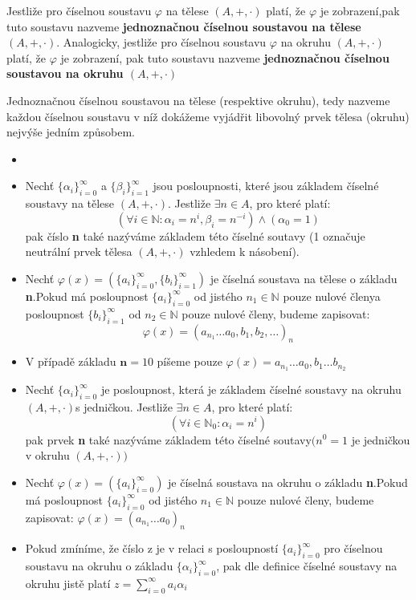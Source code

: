 \documentclass[czech,bachelor,dept470,male]{diploma}
\newcommand{\poslbeta}{\{\beta_i\}_{i=1}^{\infty}}
\newcommand{\poslalpha}{\{\alpha_i\}_{i=0}^{\infty}}
\newcommand{\posla}{\{a_i\}_{i=0}^{\infty}}
\newcommand{\poslb}{\{b_i\}_{i=1}^{\infty}}
\begin{document}
\begin{definition}
	Jestliže pro číselnou soustavu $\varphi$ na tělese $(A,+,\cdot)$ platí, že $\varphi$ je zobrazení,\newline pak tuto soustavu nazveme \textbf{jednoznačnou číselnou soustavou na tělese $(A,+,\cdot)$}. Analogicky, jestliže pro číselnou soustavu $\varphi$ na okruhu $(A,+,\cdot)$ platí, že $\varphi$ je zobrazení, pak tuto soustavu nazveme \textbf{jednoznačnou číselnou soustavou na okruhu $(A,+,\cdot)$}
\end{definition}
Jednoznačnou číselnou soustavou na tělese (respektive okruhu), tedy nazveme každou číselnou soustavu v níž dokážeme vyjádřit libovolný prvek tělesa (okruhu) nejvýše jedním způsobem.
\begin{agreement}\label{u1}
	\begin{itemize}
		\item[]
		\item Nechť $\poslalpha$ a $\poslbeta$ jsou posloupnosti, které jsou základem číselné soustavy na tělese $(A,+,\cdot)$. Jestliže $\exists n \in A$, pro které platí:
		      $$ (\forall i \in \mathbb{N} : \alpha_i = n^i,\beta_i = n^{-i}) \land (\alpha_{0} = 1)$$
		      pak číslo \textbf{n} také nazýváme základem této číselné soutavy (1 označuje neutrální prvek tělesa $(A,+,\cdot)$ vzhledem k násobení).
		\item Nechť $\varphi(x) = (\posla,\poslb)$ je číselná soustava na tělese o základu \textbf{n}.\newline Pokud má posloupnost $\posla$ od jistého $n_1\in\mathbb{N}$ pouze nulové členy\newline a posloupnost $\poslb$ od $n_2\in\mathbb{N}$ pouze nulové členy, budeme zapisovat:
		      $$\varphi(x) = (a_{n_1} \dots a_0,b_1, b_2,\dots)_n$$
		\item V případě základu $\textbf{n}=10$ píšeme pouze $\varphi(x) = a_{n_1} \dots a_0,b_1 \dots b_{n_2}$
		\item Nechť $\poslalpha$ je posloupnost, která je základem číselné soustavy na okruhu $(A,+,\cdot)$\newline s jedničkou. Jestliže $\exists n \in A$, pro které platí:
		      $$(\forall i \in \mathbb{N}_0 : \alpha_i = n^i)$$
		      pak prvek \textbf{n} také nazýváme základem této číselné soutavy\newline $( n^0=1$ je jedničkou v okruhu $(A,+,\cdot) )$
		\item Nechť $\varphi(x) = (\posla)$ je číselná soustava na okruhu o základu \textbf{n}.\newline Pokud má posloupnost $\posla$ od jistého $n_1\in\mathbb{N}$ pouze nulové členy, budeme zapisovat: $\varphi(x) = (a_{n_1} \dots a_0)_n$
		\item Pokud zmíníme, že číslo z je v relaci s posloupností $\posla$ pro číselnou soustavu na okruhu o základu $\{\alpha_i\}_{i=0}^\infty$, pak dle definice číselné soustavy na okruhu jistě platí $z = \sum_{i=0}^{\infty} a_{i}\alpha_{i}$
	\end{itemize}
\end{agreement}
\newpage
\end{document}

